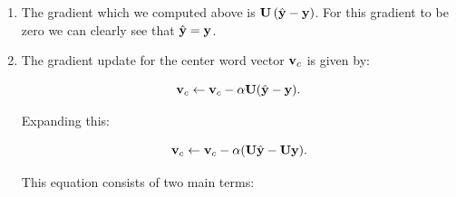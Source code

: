 \begin{parts}
{\begin{enumerate}[label=\roman*.]
{        \paragraph{Dimension Check:}
        To verify that $\frac{\partial \bJ_{\text{naive-softmax}}}{\partial \bv_c}$ has the correct shape, let's analyze the dimensions of each term:

        \begin{itemize}
            \item $\bU \in \mathbb{R}^{d \times |\text{Vocab}|}$, where $d$ is the embedding size.
            \item $\bv_c \in \mathbb{R}^{d \times 1}$, representing the center word vector.
            \item $\bu_o \in \mathbb{R}^{d \times 1}$, representing the true outside word vector.
            \item $\by, \hat{\by} \in \mathbb{R}^{|\text{Vocab}| \times 1}$, both column vectors.
        \end{itemize}

        The subtraction $\hat{\by} - \by$ results in a column vector of shape $\mathbb{R}^{|\text{Vocab}| \times 1}$.
        Since $\bU$ has shape $(d \times |\text{Vocab}|)$, multiplying:

        \[
        \bU (\hat{\by} - \by)
        \]

        gives a final result of shape $(d \times 1)$,
        which matches the expected dimension of $\frac{\partial \bJ}{\partial \bv_c}$.

        }

    \item {
        The gradient which we computed above is $\mathbf{U} \left( \hat{\mathbf{y}} - \mathbf{y} \right)$.
        For this gradient to be zero we can clearly see that $\hat{\mathbf{y}} = \mathbf{y}$.
    }
    \item {

    The gradient update for the center word vector $\mathbf{v}_c$ is given by:

    \[
    \mathbf{v}_c \gets \mathbf{v}_c - \alpha \mathbf{U} (\hat{\mathbf{y}} - \mathbf{y}).
    \]

    Expanding this:

    \[
    \mathbf{v}_c \gets \mathbf{v}_c - \alpha (\mathbf{U} \hat{\mathbf{y}} - \mathbf{U} \mathbf{y}).
    \]

    This equation consists of two main terms:

}
\end{enumerate}}
\end{parts}
